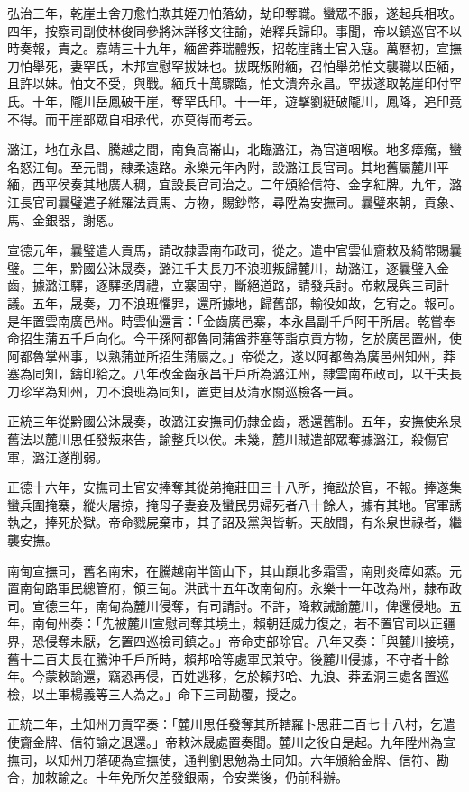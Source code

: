 \begin{pinyinscope}
弘治三年，乾崖土舍刀愈怕欺其姪刀怕落幼，劫印奪職。蠻眾不服，遂起兵相攻。四年，按察司副使林俊同參將沐詳移文往諭，始釋兵歸印。事聞，帝以鎮巡官不以時奏報，責之。嘉靖三十九年，緬酋莽瑞體叛，招乾崖諸土官入寇。萬曆初，宣撫刀怕舉死，妻罕氏，木邦宣慰罕拔妹也。拔既叛附緬，召怕舉弟怕文襲職以臣緬，且許以妹。怕文不受，與戰。緬兵十萬驟臨，怕文潰奔永昌。罕拔遂取乾崖印付罕氏。十年，隴川岳鳳破干崖，奪罕氏印。十一年，遊擊劉綎破隴川，鳳降，追印竟不得。而干崖部眾自相承代，亦莫得而考云。

潞江，地在永昌、騰越之間，南負高崙山，北臨潞江，為官道咽喉。地多瘴癘，蠻名怒江甸。至元間，隸柔遠路。永樂元年內附，設潞江長官司。其地舊屬麓川平緬，西平侯奏其地廣人稠，宜設長官司治之。二年頒給信符、金字紅牌。九年，潞江長官司曩璧遣子維羅法貢馬、方物，賜鈔幣，尋陞為安撫司。曩璧來朝，貢象、馬、金銀器，謝恩。

宣德元年，曩璧遣人貢馬，請改隸雲南布政司，從之。遣中官雲仙齎敕及綺幣賜曩璧。三年，黔國公沐晟奏，潞江千夫長刀不浪班叛歸麓川，劫潞江，逐曩璧入金齒，據潞江驛，逐驛丞周禮，立寨固守，斷絕道路，請發兵討。帝敕晟與三司計議。五年，晟奏，刀不浪班懼罪，還所據地，歸舊部，輸役如故，乞宥之。報可。是年置雲南廣邑州。時雲仙還言：「金齒廣邑寨，本永昌副千戶阿干所居。乾嘗奉命招生蒲五千戶向化。今干孫阿都魯同蒲酋莽塞等詣京貢方物，乞於廣邑置州，使阿都魯掌州事，以熟蒲並所招生蒲屬之。」帝從之，遂以阿都魯為廣邑州知州，莽塞為同知，鑄印給之。八年改金齒永昌千戶所為潞江州，隸雲南布政司，以千夫長刀珍罕為知州，刀不浪班為同知，置吏目及清水關巡檢各一員。

正統三年從黔國公沐晟奏，改潞江安撫司仍隸金齒，悉還舊制。五年，安撫使糸泉舊法以麓川思任發叛來告，諭整兵以俟。未幾，麓川賊遣部眾奪據潞江，殺傷官軍，潞江遂削弱。

正德十六年，安撫司土官安捧奪其從弟掩莊田三十八所，掩訟於官，不報。捧遂集蠻兵圍掩寨，縱火屠掠，掩母子妻妾及蠻民男婦死者八十餘人，據有其地。官軍誘執之，捧死於獄。帝命戮屍棄市，其子詔及黨與皆斬。天啟間，有糸泉世祿者，繼襲安撫。

南甸宣撫司，舊名南宋，在騰越南半箇山下，其山巔北多霜雪，南則炎瘴如蒸。元置南甸路軍民總管府，領三甸。洪武十五年改南甸府。永樂十一年改為州，隸布政司。宣德三年，南甸為麓川侵奪，有司請討。不許，降敕誡諭麓川，俾還侵地。五年，南甸州奏：「先被麓川宣慰司奪其境土，賴朝廷威力復之，若不置官司以正疆界，恐侵奪未厭，乞置四巡檢司鎮之。」帝命吏部除官。八年又奏：「與麓川接境，舊十二百夫長在騰沖千戶所時，賴邦哈等處軍民兼守。後麓川侵據，不守者十餘年。今蒙敕諭還，竊恐再侵，百姓逃移，乞於賴邦哈、九浪、莽孟洞三處各置巡檢，以土軍楊義等三人為之。」命下三司勘覆，授之。

正統二年，土知州刀貢罕奏：「麓川思任發奪其所轄羅卜思莊二百七十八村，乞遣使齎金牌、信符諭之退還。」帝敕沐晟處置奏聞。麓川之役自是起。九年陞州為宣撫司，以知州刀落硬為宣撫使，通判劉思勉為土同知。六年頒給金牌、信符、勘合，加敕諭之。十年免所欠差發銀兩，令安業後，仍前科辦。


\end{pinyinscope}
